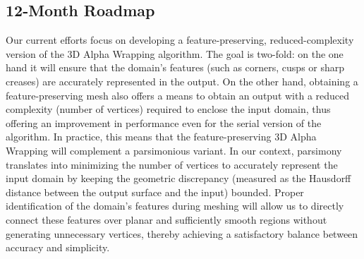 \subsection{12-Month Roadmap}
\label{sec:WP1:CGAL:roadmap}




Our current efforts focus on developing a feature-preserving, reduced-complexity version of the 3D Alpha Wrapping algorithm.
The goal is two-fold: on the one hand it will ensure that the domain's features (such as corners, cusps or sharp creases) are accurately represented in the output. On the other hand, obtaining a feature-preserving mesh also offers a means to obtain an output with a reduced complexity (number of vertices) required to enclose the input domain, thus offering an improvement in performance even for the serial version of the algorithm. 
In practice, this means that the feature-preserving 3D Alpha Wrapping will complement a parsimonious variant.
In our context, parsimony translates into minimizing the number of vertices to accurately represent the input domain by keeping the geometric discrepancy (measured as the Hausdorff distance between the output surface and the input) bounded.
Proper identification of the domain's features during meshing will allow us to directly connect these features over planar and sufficiently smooth regions without generating unnecessary vertices, thereby achieving a satisfactory balance between accuracy and simplicity.


